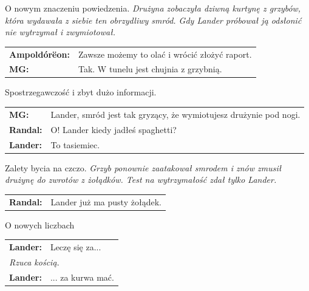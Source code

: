 \documentclass[10pt,twoside,twocolumn]{book}
\begin{document}
\begin{rpg-quotebox}{O nowym znaczeniu powiedzenia.}
   \textit{Drużyna zobaczyła dziwną kurtynę z grzybów, która wydawała z siebie ten obrzydliwy smród. Gdy Lander próbował ją odsłonić nie wytrzymał i zwymiotował.}\\

   \begin{tabularx}{\columnwidth}{lX}
      \textbf{Ampoldórëon:} & Zawsze możemy to olać i wrócić złożyć raport.\\
      \textbf{MG:} & Tak. W tunelu jest chujnia z grzybnią.\\
   \end{tabularx}
\end{rpg-quotebox}


\begin{rpg-quotebox}{Spostrzegawczość i zbyt dużo informacji.}
   \begin{tabularx}{\columnwidth}{lX}
      \textbf{MG:} & Lander, smród jest tak gryzący, że wymiotujesz drużynie pod nogi.\\
      \textbf{Randal:} & O! Lander kiedy jadłeś spaghetti?\\
      \textbf{Lander:} & To tasiemiec.\\
   \end{tabularx}
\end{rpg-quotebox}


\begin{rpg-quotebox}{Zalety bycia na czczo.}
   \textit{Grzyb ponownie zaatakował smrodem i znów zmusił drużynę do zwrotów z żołądków. Test na wytrzymałość zdał tylko Lander.}\\

   \begin{tabularx}{\columnwidth}{lX}
      \textbf{Randal:} & Lander już ma pusty żołądek.\\
   \end{tabularx}
\end{rpg-quotebox}


\begin{rpg-quotebox}{O nowych liczbach}
   \begin{tabularx}{\columnwidth}{lX}
      \textbf{Lander:} & Leczę się za...\\
      \multicolumn{2}{l}{\textit{Rzuca kością.}}\\
      \textbf{Lander:} & ... za kurwa mać.\\
   \end{tabularx}
\end{rpg-quotebox}
\end{document}
